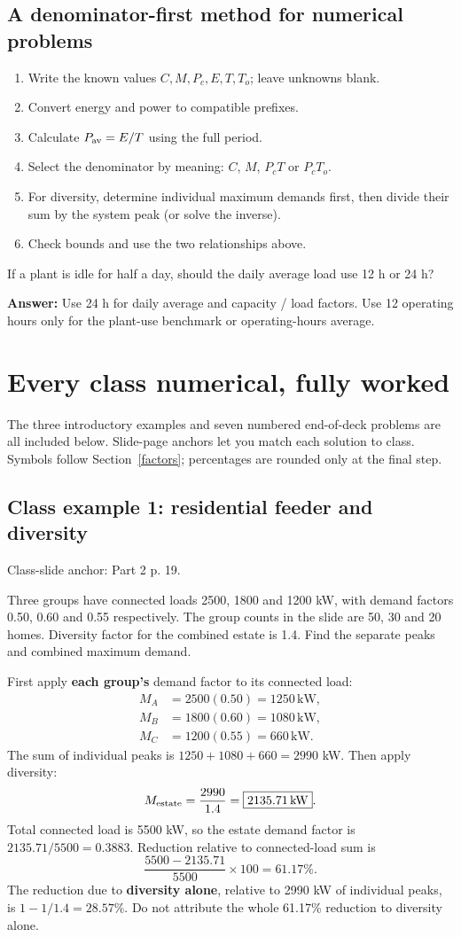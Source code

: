 \documentclass[11pt,a4paper]{article}
\newenvironment{Worked}[1]{\begin{tcolorbox}[breakable=false,colback=white,colframe=teal,colbacktitle=pale,coltitle=ink,title={#1}]}{\end{tcolorbox}}
\newcommand{\slides}[1]{{\small\color{muted}\textsf{Class-slide anchor: #1.}}\par}
\newcommand{\chapterstart}[2]{\clearpage\section{#1}\label{#2}}
\newcommand{\checkq}[2]{\begin{tcolorbox}[breakable=false,colback=pale,colframe=teal,coltitle=white,title={Check your understanding}]#1\par\textbf{Answer:} #2\end{tcolorbox}}
\begin{document}
\subsection{A denominator-first method for numerical problems}
\begin{enumerate}
\item Write the known values $C,M,P_c,E,T,T_o$; leave unknowns blank.
\item Convert energy and power to compatible prefixes.
\item Calculate $P_{\rm av}=E / T$ using the full period.
\item Select the denominator by meaning: $C$, $M$, $P_cT$ or $P_cT_o$.
\item For diversity, determine individual maximum demands first, then divide their sum by the system peak (or solve the inverse).
\item Check bounds and use the two relationships above.
\end{enumerate}
\checkq{If a plant is idle for half a day, should the daily average load use 12 h or 24 h?}{Use 24 h for daily average and capacity / load factors. Use 12 operating hours only for the plant-use benchmark or operating-hours average.}

\chapterstart{Every class numerical, fully worked}{classproblems}
The three introductory examples and seven numbered end-of-deck problems are all included below. Slide-page anchors let you match each solution to class. Symbols follow Section~\ref{factors}; percentages are rounded only at the final step.

\subsection{Class example 1: residential feeder and diversity}
\slides{Part 2 p. 19}
\begin{Worked}{Given and required}
Three groups have connected loads 2500, 1800 and 1200 kW, with demand factors 0.50, 0.60 and 0.55 respectively. The group counts in the slide are 50, 30 and 20 homes. Diversity factor for the combined estate is 1.4. Find the separate peaks and combined maximum demand.
\end{Worked}
First apply \textbf{each group's} demand factor to its connected load:
\begin{align*}
M_A&=2500(0.50)=1250\,\mathrm{kW},\\
M_B&=1800(0.60)=1080\,\mathrm{kW},\\
M_C&=1200(0.55)=660\,\mathrm{kW}.
\end{align*}
The sum of individual peaks is $1250+1080+660=2990$ kW. Then apply diversity:
\[
M_{\rm estate}=\frac{2990}{1.4}=\boxed{2135.71\,\mathrm{kW}}.
\]
Total connected load is 5500 kW, so the estate demand factor is $2135.71/5500=0.3883$. Reduction relative to connected-load sum is
\[
\frac{5500-2135.71}{5500}\times100=61.17\%.
\]
The reduction due to \textbf{diversity alone}, relative to 2990 kW of individual peaks, is $1-1/1.4=28.57\%$. Do not attribute the whole 61.17\% reduction to diversity alone.
\end{document}

